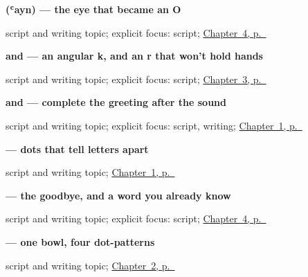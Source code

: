 \noindent\begin{minipage}[t]{\linewidth}
\raggedright
\textbf{ (ʿayn) — the eye that became an O}\par
\footnotesize script and writing topic; explicit focus: script; \hyperref[ch:ar-farewells]{Chapter~4, p.~\pageref*{ch:ar-farewells}}
\end{minipage}\par\smallskip

\noindent\begin{minipage}[t]{\linewidth}
\raggedright
\textbf{ and  — an angular k, and an r that won't hold hands}\par
\footnotesize script and writing topic; explicit focus: script; \hyperref[ch:ar-how-are-you]{Chapter~3, p.~\pageref*{ch:ar-how-are-you}}
\end{minipage}\par\smallskip

\noindent\begin{minipage}[t]{\linewidth}
\raggedright
\textbf{ and  — complete the greeting after the sound}\par
\footnotesize script and writing topic; explicit focus: script, writing; \hyperref[ch:greetings]{Chapter~1, p.~\pageref*{ch:greetings}}
\end{minipage}\par\smallskip

\noindent\begin{minipage}[t]{\linewidth}
\raggedright
\textbf{  — dots that tell letters apart}\par
\footnotesize script and writing topic; \hyperref[ch:greetings]{Chapter~1, p.~\pageref*{ch:greetings}}
\end{minipage}\par\smallskip

\noindent\begin{minipage}[t]{\linewidth}
\raggedright
\textbf{  — the goodbye, and a word you already know}\par
\footnotesize script and writing topic; explicit focus: script; \hyperref[ch:ar-farewells]{Chapter~4, p.~\pageref*{ch:ar-farewells}}
\end{minipage}\par\smallskip

\noindent\begin{minipage}[t]{\linewidth}
\raggedright
\textbf{   — one bowl, four dot-patterns}\par
\footnotesize script and writing topic; \hyperref[ch:introductions]{Chapter~2, p.~\pageref*{ch:introductions}}
\end{minipage}\par\smallskip

